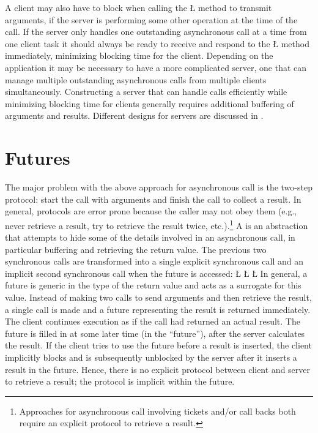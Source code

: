 \documentclass[openright,twoside]{report}
\begin{document}
A client may also have to block when calling the \LGinlinetrue\LGbegin\lgrinde\L{}\endlgrinde\LGend{} method to transmit arguments, if the server is performing some other operation at the time of the call.
If the server only handles one outstanding asynchronous call at a time from one client task it should always be ready to receive and respond to the \LGinlinetrue\LGbegin\lgrinde\L{}\endlgrinde\LGend{} method immediately, minimizing blocking time for the client.
Depending on the application it may be necessary to have a more complicated server, one that can manage multiple outstanding asynchronous calls from multiple clients simultaneously.
Constructing a server that can handle calls efficiently while minimizing blocking time for clients generally requires additional buffering of arguments and results.
Different designs for servers are discussed in .


\section{Futures}

The major problem with the above approach for asynchronous call is the two-step protocol: start the call with arguments and finish the call to collect a result.
In general, protocols are error prone because the caller may not obey them (e.g., never retrieve a result, try to retrieve the result twice, etc.).\footnote{
Approaches for asynchronous call involving tickets and/or call backs both require an explicit protocol to retrieve a result.}
A  is an abstraction that attempts to hide some of the details involved in an asynchronous call, in particular buffering and retrieving the return value.
The previous two synchronous calls are transformed into a single explicit synchronous call and an implicit second synchronous call when the future is accessed:
\LGinlinefalse\LGbegin\lgrinde
\L{}
\CE{}\L{}
\CE{}\L{}
\CE{}\endlgrinde\LGend
In general, a future is generic in the type of the return value and acts as a surrogate for this value.
Instead of making two calls to send arguments and then retrieve the result, a single call is made and a future representing the result is returned immediately.
The client continues execution as if the call had returned an actual result.
The future is filled in at some later time (in the ``future''), after the server calculates the result.
If the client tries to use the future before a result is inserted, the client implicitly blocks and is subsequently unblocked by the server after it inserts a result in the future.
Hence, there is no explicit protocol between client and server to retrieve a result;
the protocol is implicit within the future.
\end{document}
